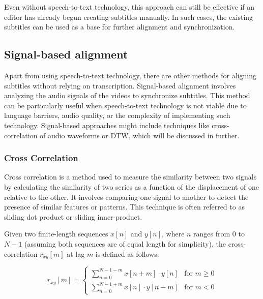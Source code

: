 Even without speech-to-text technology, this approach can still be effective if an editor has already begun creating subtitles manually. In such cases, the existing subtitles can be used as a base for further alignment and synchronization.

\subsection{Signal-based alignment}
\label{theory:algo}

Apart from using speech-to-text technology, there are other methods for aligning subtitles without relying on transcription. Signal-based alignment involves analyzing the audio signals of the videos to synchronize subtitles. This method can be particularly useful when speech-to-text technology is not viable due to language barriers, audio quality, or the complexity of implementing such technology. Signal-based approaches might include techniques like cross-correlation of audio waveforms or DTW, which will be discussed in further.

\subsubsection{Cross Correlation}

Cross correlation is a method used to measure the similarity between two signals by calculating the similarity of two series as a function of the displacement of one relative to the other. It involves comparing one signal to another to detect the presence of similar features or patterns. This technique is often referred to as sliding dot product or sliding inner-product.

Given two finite-length sequences \( x[n] \) and \( y[n] \), where \( n \) ranges from 0 to \( N-1 \) (assuming both sequences are of equal length for simplicity), the cross-correlation \( r_{xy}[m] \) at lag \( m \) is defined as follows:

\begin{equation}
\label{eq23}
    r_{xy}[m] = 
    \begin{cases} 
        \sum_{n=0}^{N-1-m} x[n+m] \cdot y[n] & \text{for } m \geq 0 \\
        \sum_{n=0}^{N-1+m} x[n] \cdot y[n-m] & \text{for } m < 0 
    \end{cases}
\end{equation}

